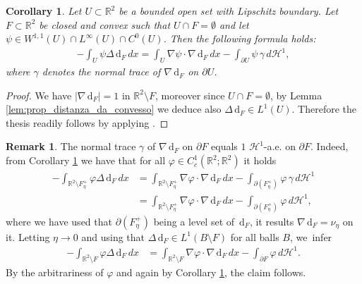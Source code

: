 \documentclass[11pt]{article}
\numberwithin{equation}{section}
\newcommand{\R}{\mathbb{R}}
\newcommand{\di}{\,\mathrm{d}}
\newtheorem{cor}[theorem]{Corollary}
\theoremstyle{definition}
\newtheorem{remark}[theorem]{Remark}
\begin{document}
\begin{cor}\label{cor:integration_by_parts}
Let $U\subset\R^2$ be a bounded open set with Lipschitz boundary. Let $F\subset\R^2$ be closed and convex such that $U\cap F=\emptyset$ and let $\psi\in W^{1,1}(U)\cap L^\infty(U)\cap C^0(U)$. Then the following formula holds:
\begin{equation*}
\begin{split}
- \int_{U}\psi\Delta\di_{F}\,dx
=
\int_{U} \nabla\psi\cdot\nabla\di_{F}\,dx- \int_{\partial U}\psi\,\gamma\,d\mathcal{H}^1,
\end{split}
\end{equation*}
where $\gamma$ denotes the normal trace of $\nabla\di_F$ on $\partial U$.
\end{cor}

\begin{proof}
We have $|\nabla \di_F|=1$ in $\R^2\setminus F$, moreover since $U\cap F=\emptyset$, by
Lemma \ref{lem:prop_distanza_da_convesso} we deduce also $\Delta\di_F\in L^1(U)$. Therefore the thesis readily follows by applying \hbox{\cite[Th.\,1.9]{A}}.
\end{proof}

\begin{remark}\label{rem:traccia}
The normal trace $\gamma$ of $\nabla\di_F$ on $\partial F$ equals $1$ $\mathcal H^1$-a.e. on $\partial F$. Indeed, from Corollary \ref{cor:integration_by_parts} we have that for all $\varphi\in C^1_c(\R^2;\R^2)$ it holds
\begin{align}
- \int_{\R^2\setminus F^+_\eta}\varphi\Delta\di_{F}\,dx
&=
\int_{\R^2\setminus F^+_\eta} \nabla\varphi\cdot\nabla\di_{F}\,dx- \int_{\partial(F_\eta^+)}\varphi\,\gamma\,d\mathcal{H}^1\nonumber\\
&=\int_{\R^2\setminus F^+_\eta} \nabla\varphi\cdot\nabla\di_{F}\,dx- \int_{\partial(F_\eta^+)}\varphi\,d\mathcal{H}^1,\nonumber
\end{align}
where we have used that $\partial (F_\eta^+)$ being a level set of $\di_F$, it results $\nabla\di_F=\nu_\eta$ on it.
Letting $\eta\to 0$ and using that $\Delta \di_F\in L^1(B\setminus F)$ for all balls $B$, we~infer
\begin{align}
-\int_{\R^2\setminus F}\varphi\Delta\di_{F}\,dx
&=
\int_{\R^2\setminus F} \nabla\varphi\cdot\nabla\di_{F}\,dx- \int_{\partial F}\varphi\,d\mathcal{H}^1.\nonumber
\end{align}
By the arbitrariness of $\varphi$ and again by Corollary \ref{cor:integration_by_parts}, the claim follows.
\end{remark}
\end{document}
